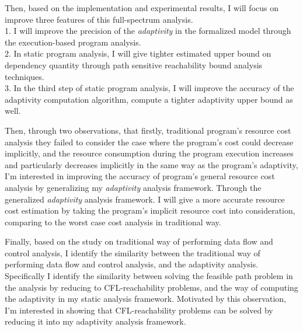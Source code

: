    Then, based on the implementation and experimental results, 
   I will focus on improve three features of this full-spectrum analysis.
   \\
   1. I will improve the precision of the \emph{adaptivity} in the formalized model through the execution-based program analysis.
   \\
   2. In static program analysis, I will give tighter estimated upper bound on dependency quantity through 
   path sensitive reachability bound analysis techniques. 
   \\
   3. In the third step of static program analysis, I will improve the accuracy of the adaptivity computation algorithm,
   compute a tighter adaptivity upper bound as well.
   
   Then, through two observations,
   that 
   firstly, traditional program's resource cost analysis they failed to consider the case where the program's cost could decrease 
   implicitly, and 
   the resource consumption during the program 
   execution increases and particularly decreases implicitly in the same way as the program's adaptivity, 
   I'm interested in improving the accuracy of program's general resource cost analysis
   by generalizing my \emph{adaptivity} analysis framework.
   Through the generalized \emph{adaptivity} analysis framework.
   I will give
   a more accurate resource cost estimation by taking the program's implicit resource cost into consideration, comparing 
   to the worst case cost analysis in traditional way.

   Finally, based on the study on traditional way of performing data flow and control analysis,
   I identify the similarity between the traditional way of performing data flow and control analysis, and the 
   adaptivity analysis.  
   Specifically I identify the similarity between 
   solving the feasible path problem in the analysis by reducing to CFL-reachability problems,
   and the way of computing the adaptivity in my static analysis framework.
   Motivated by this observation, 
   I'm interested in showing that
   CFL-reachability problems can be solved by reducing it into my adaptivity analysis framework.
